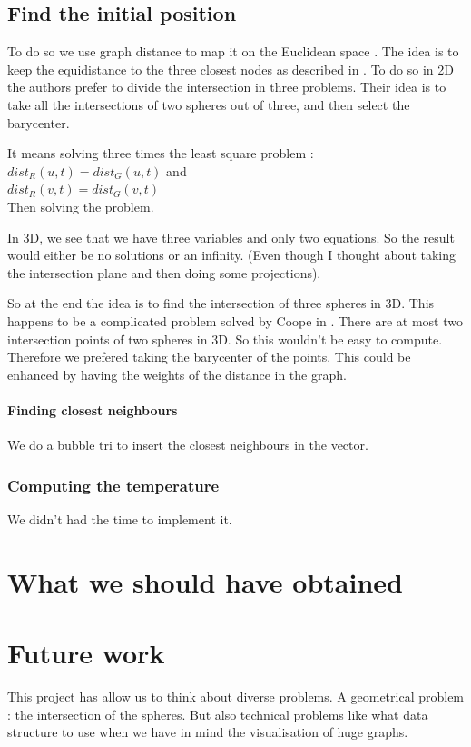 \documentclass{article}
\begin{document}
\subsection{Find the initial position}
To do so we use graph distance to map it on the Euclidean space . The idea is to keep the equidistance to the three closest nodes as described in \cite{gajer00}. 
To do so in 2D the authors prefer to divide the intersection in three problems. Their idea is to take all the intersections of two spheres out of three, and then select the barycenter.

It means solving three times the least square problem : \\
$dist_{R}(u, t) = dist_{G}(u, t)$ and \\
$dist_{R}(v, t) = dist_{G}(v, t)$ \\
Then solving the problem. 

In 3D, we see that we have three variables and only two equations. So the result would either be no solutions or an infinity. (Even though I thought about taking  the intersection plane and then doing some projections). 

So at the end the idea is to find the intersection of three spheres in 3D. This happens to be a complicated problem solved by Coope in \cite{nsphere}. There are at most two intersection points of two spheres in 3D. So this wouldn't be easy to compute. Therefore we prefered taking the barycenter of the points. This could be enhanced by having the weights of the distance in the graph. 


\paragraph{Finding closest neighbours}
We do a bubble tri to insert the closest neighbours in the vector. 

\subsubsection{Computing the temperature}
We didn't had the time to implement it.


\section{What we should have obtained}

\section{Future work}
This project has allow us to think about diverse problems. A geometrical problem : the intersection of the spheres. But also technical problems like what data structure to use when we have in mind the visualisation of huge graphs.
\end{document}
